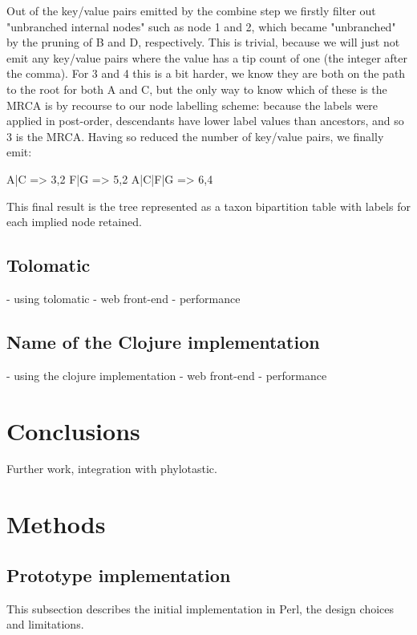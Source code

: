 \documentclass[10pt]{bmc_article}
\newenvironment{bmcformat}{\begin{raggedright}\baselineskip20pt\sloppy\setboolean{publ}{false}}{\end{raggedright}\baselineskip20pt\sloppy}
\begin{document}
\begin{bmcformat}
		Out of the key/value pairs emitted by the combine step we firstly filter 
		out "unbranched internal nodes" such as node 1 and 2, which became 
		"unbranched" by the pruning of B and D, respectively. This is trivial, 
		because we will just not emit any key/value pairs where the value has a
		tip count of one (the integer after the comma). For 3 and 4 this is a bit 
		harder, we know they are both on the path to the root for both A and C, but 
		the only way to know which of these is the MRCA is by recourse to our 
		node labelling scheme: because the labels were applied in post-order, 
		descendants have lower label values than ancestors, and so 3 is the MRCA. 
		Having so reduced the number of key/value pairs, we finally emit:

		 A|C     => 3,2
		 F|G     => 5,2
		 A|C|F|G => 6,4

		This final result is the tree represented as a taxon bipartition table 
		with labels for each implied node retained.

  \subsection*{Tolomatic}
  - using tolomatic
  - web front-end
  - performance

  \subsection*{Name of the Clojure implementation}
  - using the clojure implementation
  - web front-end
  - performance

\section*{Conclusions}
  Further work, integration with phylotastic.
  
\section*{Methods}

  \subsection*{Prototype implementation}
	This subsection describes the initial implementation in Perl,
	the design choices and limitations.


\end{bmcformat}
\end{document}
